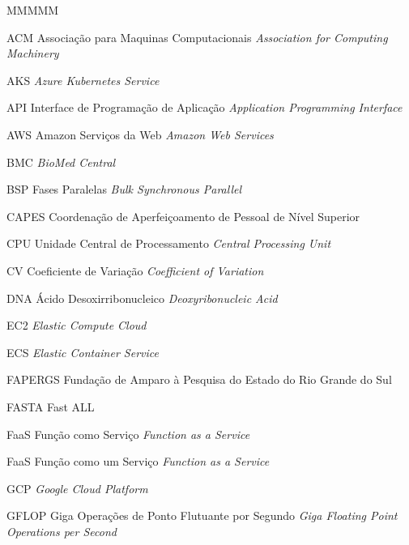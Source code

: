 \documentclass[english,brazilian]{UNISINOSmonografia} %
\begin{document}
%
\begin{listadesiglas}{MMMMM}
	\item[ACM] Associação para Maquinas Computacionais \newline \textit{Association for Computing Machinery}
	\item[AKS] \textit{Azure Kubernetes Service}
	\item[API] Interface de Programação de Aplicação \newline \textit{Application Programming Interface}
	\item[AWS] Amazon Serviços da Web \newline \textit{Amazon Web Services}
	\item[BMC] \textit{BioMed Central}
	\item[BSP] Fases Paralelas \newline \textit{Bulk Synchronous Parallel}
	\item[CAPES] Coordenação de Aperfeiçoamento de Pessoal de Nível Superior
	\item[CPU] Unidade Central de Processamento \newline \textit{Central Processing Unit}
	\item[CV] Coeficiente de Variação \newline \textit{Coefficient of Variation}
	\item[DNA] Ácido Desoxirribonucleico \newline \textit{Deoxyribonucleic Acid}
	\item[EC2] \textit{Elastic Compute Cloud}
	\item[ECS] \textit{Elastic Container Service}
	\item[FAPERGS] Fundação de Amparo à Pesquisa do Estado do Rio Grande do Sul
	\item[FASTA] Fast ALL
	\item[FaaS] Função como Serviço \newline \textit{Function as a Service}
	\item[FaaS] Função como um Serviço \newline \textit{Function as a Service}
	\item[GCP] \textit{Google Cloud Platform}
	\item[GFLOP] Giga Operações de Ponto Flutuante por Segundo \newline \textit{Giga Floating Point Operations per Second}

\end{listadesiglas}
\end{document}
